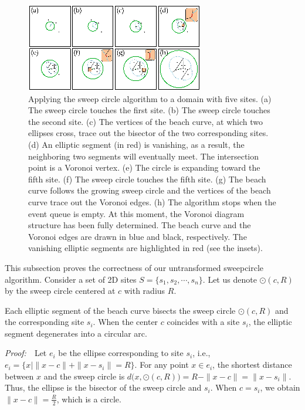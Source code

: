 {{\begin{figure}[!htbp]
\centering
\includegraphics[width=1\linewidth]{figs/sweepcircle/sweepcircleExample3.PNG}
\vspace{-0.1in}\caption{Applying the sweep circle algorithm to a
domain with five sites. (a) The sweep circle touches the first site.
(b) The sweep circle touches the second site. (c) The vertices of
the beach curve, at which two ellipses cross, trace out the bisector
of the two corresponding sites. (d) An elliptic segment (in red) is
vanishing, as a result, the neighboring two segments will eventually
meet. The intersection point is a Voronoi vertex. (e) The circle is
expanding toward the fifth site. (f) The sweep circle touches the
fifth site. (g) The beach curve follows the growing sweep circle and
the vertices of the beach curve trace out the Voronoi edges. (h) The
algorithm stops when the event queue is empty. At this moment, the
Voronoi diagram structure has been fully determined. The beach curve
and the Voronoi edges are drawn in blue and black, respectively. The
vanishing elliptic segments are highlighted in red (see the
insets).} \label{fig:sweepcircleExample}
\end{figure}

This subsection proves the correctness of our untransformed sweepcircle
algorithm. Consider a set of 2D sites $S=\{s_1,s_2,\cdots,s_n\}$.
Let us denote $\odot(c,R)$ by the sweep circle centered at $c$ with
radius $R$.
  \vspace{0.2in}
\begin{lemma}\label{lema1} Each elliptic segment of the beach curve
bisects the sweep circle $\odot(c,R)$ and the corresponding site
$s_i$. When the center $c$ coincides with a site $s_i$, the elliptic
segment degenerates into a circular arc.  \end{lemma}
\vspace{0.1in}\noindent\textit{Proof:}~~Let $e_i$ be the ellipse
corresponding to site $s_i$, i.e., $e_i=\{x|\|x-c\|+\|x-s_i\|=R\}$.
For any point $x\in e_i$, the shortest distance between $x$ and the
sweep circle is $d\big(x,\odot(c,R)\big)=R-\|x-c\|=\|x-s_i\|$. Thus,
the ellipse is the bisector of the sweep circle and $s_i$. When
$c=s_i$, we obtain $\|x-c\|=\frac{R}{2}$, which is a circle.

}}
